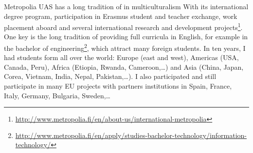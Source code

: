 Metropolia UAS has a long tradition of in multiculturalism With its international degree program, participation in Erasmus student and teacher exchange, work placement aboard and several international research and development projects\footnote{\url{http://www.metropolia.fi/en/about-us/international-metropolia}}. 
One key is the long tradition of providing full curricula in English, for example in the bachelor of engineering\footnote{\url{http://www.metropolia.fi/en/apply/studies-bachelor-technology/information-technology/}}, which attract many foreign students.
In ten years, I had students form all over the world: Europe (east and west), Americas (USA, Canada, Peru), Africa (Etiopia, Rwanda, Cameroon,\ldots) and Asia (China, Japan, Corea, Vietnam, India, Nepal, Pakistan,\ldots).
I also participated and still participate in many EU projects with partners institutions in Spain, France, Italy, Germany, Bulgaria, Sweden,\ldots
  
  
  
  
  